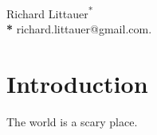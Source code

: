 \documentclass[10pt,letterpaper]{article}
\begin{document}
\vspace*{0.2in}

\begin{flushleft}
{\Large
\textbf{}
}
\newline
\\
{Richard Littauer}\textsuperscript{*}
\\
\bigskip
\textbf{*} richard.littauer@gmail.com.
\end{flushleft}

\section*{Introduction}

The world is a scary place.
\cite{Tamburri2020}



\end{document}
